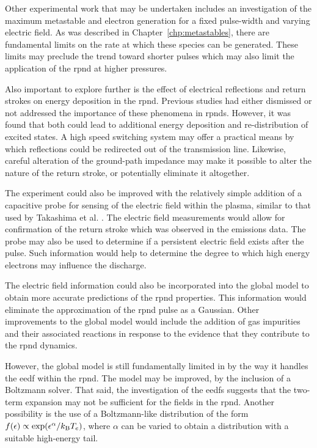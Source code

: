 Other experimental work that may be undertaken includes an investigation of the
maximum metastable and electron generation for a fixed pulse-width and varying
electric field. As was described in Chapter~\ref{chp:metastables}, there are
fundamental limits on the rate at which these species can be generated. These
limits may preclude the trend toward shorter pulses which may also limit the
application of the \acs{rpnd} at higher pressures.

Also important to explore further is the effect of electrical reflections and
return strokes on energy deposition in the \acs{rpnd}. Previous studies had
either dismissed or not addressed the importance of these phenomena in
\acs{rpnd}s. However, it was found that both could lead to additional energy
deposition and re-distribution of excited states. A high speed switching system
may offer a practical means by which reflections could be redirected out of the
transmission line. Likewise, careful alteration of the ground-path impedance may
make it possible to alter the nature of the return stroke, or potentially
eliminate it altogether.

The experiment could also be improved with the relatively simple addition of a
capacitive probe for sensing of the electric field within the plasma, similar to
that used by Takashima et al. \cite{Takashima2011}. The electric field
measurements would allow for confirmation of the return stroke which was
observed in the emissions data. The probe may also be used to determine if a
persistent electric field exists after the pulse. Such information would help to
determine the degree to which high energy electrons may influence the discharge.

The electric field information could also be incorporated into the global model
to obtain more accurate predictions of the \acs{rpnd} properties. This
information would eliminate the approximation of the \acs{rpnd} pulse as a
Gaussian. Other improvements to the global model would include the addition of
gas impurities and their associated reactions in response to the evidence that
they contribute to the \acs{rpnd} dynamics.

However, the global model is still fundamentally limited in by the way it
handles the \acs{eedf} within the \acs{rpnd}. The model may be improved, by the
inclusion of a Boltzmann solver. That said, the investigation of the \acs{eedf}s
suggests that the two-term expansion may not be sufficient for the fields in the
\acs{rpnd}. Another possibility is the use of a Boltzmann-like distribution of
the form $f(\epsilon)\propto \exp (\epsilon^\alpha / k_\mathrm{B} T_e)$, where $\alpha$
can be varied to obtain a distribution with a suitable high-energy tail.


